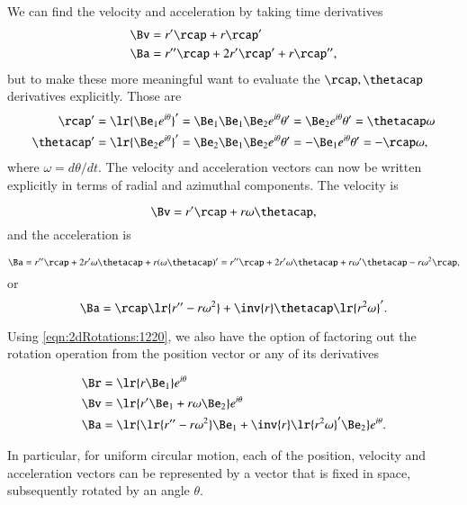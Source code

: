 {We can find the
velocity and acceleration by taking time derivatives
\begin{dmath}\label{eqn:2dRotations:1240}
\begin{aligned}
\Bv &= r' \rcap + r \rcap' \\
\Ba &= r'' \rcap + 2 r' \rcap' + r \rcap'',
\end{aligned}
\end{dmath}
but to make these more meaningful want to evaluate the \( \rcap, \thetacap \) derivatives explicitly.  Those are
\begin{equation}\label{eqn:2dRotations:1260}
\begin{aligned}
\rcap' &= \lr{ \Be_1 e^{i \theta} }' = \Be_1 \Be_1 \Be_2 e^{i\theta} \theta' = \Be_2 e^{i\theta} \theta' = \thetacap \omega \\
\thetacap' &= \lr{ \Be_2 e^{i \theta} }' = \Be_2 \Be_1 \Be_2 e^{i\theta} \theta' = -\Be_1 e^{i\theta} \theta' = -\rcap \omega,
\end{aligned}
\end{equation}
where \( \omega = d\theta/dt \).  The velocity and acceleration vectors can now be written explicitly in terms of radial and azimuthal components.  The velocity is

\begin{dmath}\label{eqn:2dRotations:1280}
\Bv = r' \rcap + r \omega \thetacap,
\end{dmath}
and the acceleration is

\begin{dmath}\label{eqn:2dRotations:1300}
\Ba
= r'' \rcap + 2 r' \omega \thetacap + r (\omega \thetacap)'
= r'' \rcap + 2 r' \omega \thetacap + r \omega' \thetacap - r \omega^2 \rcap,
\end{dmath}
or
\begin{dmath}\label{eqn:2dRotations:1320}
\Ba
= \rcap \lr{ r'' - r \omega^2 }
+ \inv{r} \thetacap \lr{ r^2 \omega }'.
\end{dmath}

Using \cref{eqn:2dRotations:1220}, we also have the option of factoring out the rotation operation from the position vector or any of its derivatives

\begin{dmath}\label{eqn:2dRotations:1360}
\begin{aligned}
\Br &= \lr{ r \Be_1 } e^{i \theta } \\
\Bv &= \lr{ r' \Be_1 + r \omega \Be_2 } e^{i \theta } \\
\Ba &= \lr{ \lr{ r'' - r \omega^2 } \Be_1 + \inv{r} \lr{ r^2 \omega }' \Be_2 } e^{i\theta}.
\end{aligned}
\end{dmath}

In particular,
for uniform circular motion, each of the position, velocity and acceleration vectors can be represented by a vector that is fixed in space, subsequently rotated by an angle \( \theta \).
} %

